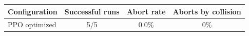 \begin{tabular}{lccc}
\toprule
Configuration & Successful runs & Abort rate & Aborts by collision \\
\midrule
PPO optimized & 5/5 & 0.0\% & 0\% \\
\bottomrule
\end{tabular}
